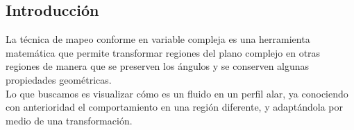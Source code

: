 \documentclass[portrait]{Hylangtechposter}
\begin{document}
\begin{multicols}{2} %

  \color{black}
  
\section*{Introducción}
\noindent La técnica de mapeo conforme en variable compleja es una herramienta matemática
que permite transformar regiones del plano complejo en otras regiones de manera que
se preserven los ángulos y se conserven algunas propiedades geométricas. \\
Lo que buscamos es visualizar  cómo es un fluido en un perfil alar,  
ya conociendo con anterioridad el comportamiento en una región diferente, y adaptándola por medio de una transformación.

\end{multicols}
\end{document}
